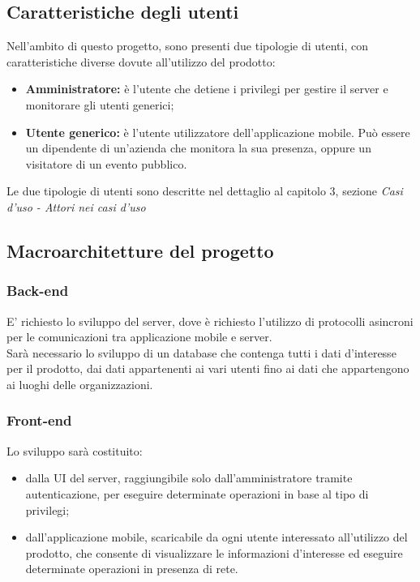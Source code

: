 \documentclass[../analisi-dei-requisiti]{subfiles}
\begin{document}
\subsection{Caratteristiche degli utenti}%
\label{sub:caratteristiche_degli_utenti}
Nell'ambito di questo progetto, sono presenti due tipologie di utenti, con caratteristiche diverse dovute all'utilizzo del prodotto:
\begin{itemize}
  \item \textbf{Amministratore:} è l'utente che detiene i privilegi per gestire il server e monitorare gli utenti generici;
  \item \textbf{Utente generico:} è l'utente utilizzatore dell'applicazione mobile. Può essere un dipendente di un'azienda che monitora la sua presenza, oppure
  un visitatore di un evento pubblico.
\end{itemize}
Le due tipologie di utenti sono descritte nel dettaglio al capitolo 3, sezione \emph{Casi d'uso - Attori nei casi d'uso}

\subsection{Macroarchitetture del progetto}%
\label{sub:macroarchitetture_del_progetto}
\subsubsection{Back-end}%
\label{par:back-end}
E' richiesto lo sviluppo  del server, dove è richiesto l'utilizzo di protocolli asincroni per le comunicazioni tra applicazione mobile e server.\\
Sarà necessario lo sviluppo di un database che contenga tutti i dati d'interesse per il prodotto, dai dati appartenenti ai vari utenti fino ai dati che appartengono ai
luoghi delle organizzazioni.
\subsubsection{Front-end}%
\label{par:front-end}
Lo sviluppo  sarà costituito:
\begin{itemize}
  \item dalla UI del server, raggiungibile solo dall'amministratore tramite autenticazione, per eseguire determinate operazioni in base al tipo di privilegi;
  \item dall'applicazione mobile, scaricabile da ogni utente interessato all'utilizzo del prodotto, che consente di visualizzare le informazioni d'interesse ed eseguire determinate
  operazioni in presenza di rete.
\end{itemize}

\end{document}
